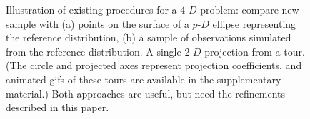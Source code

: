 \documentclass[
  12pt,
]{interact}
\begin{document}
\begin{figure}

\begin{minipage}{0.50\linewidth}



\end{minipage}%
%
\begin{minipage}{0.50\linewidth}



\end{minipage}%

\caption{\label{fig-compare}Illustration of existing procedures for a
\(4\text{-}D\) problem: compare new sample with (a) points on the
surface of a \(p\text{-}D\) ellipse representing the reference
distribution, (b) a sample of observations simulated from the reference
distribution. A single \(2\text{-}D\) projection from a tour. (The
circle and projected axes represent projection coefficients, and
animated gifs of these tours are available in the supplementary
material.) Both approaches are useful, but need the refinements
described in this paper.}

\end{figure}%
\end{document}
